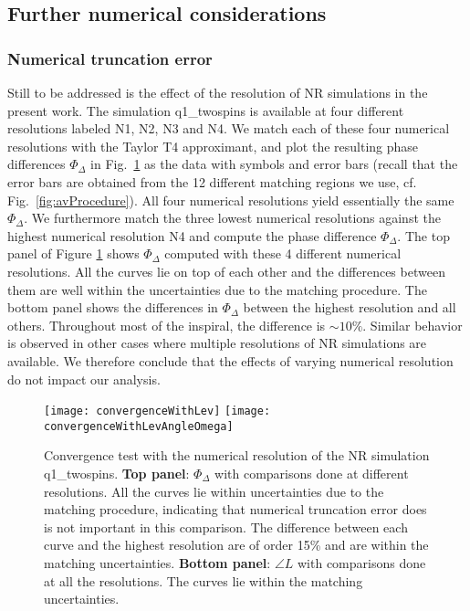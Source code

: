 \documentclass[aps,prd,amsmath,floatfix,twocolumn,superscriptaddress,nofootinbib,showpacs]{revtex4-1}
\begin{document}
\subsection{Further numerical considerations}
\label{sec:tech_cons}




\subsubsection{Numerical truncation error}

Still to be addressed is the effect of the resolution of NR
simulations in the present work.  The simulation q1\_twospins is
available at four different resolutions labeled N1, N2, N3 and N4.  We
match each of these four numerical resolutions with the Taylor T4
approximant, and plot the resulting phase differences $\Phi_\Delta$ in
Fig.~\ref{fig:convergenceWithLev} as the data with symbols and
error bars (recall that the error bars are obtained from the 12
different matching regions we use, cf. Fig.~\ref{fig:avProcedure}).
All four numerical resolutions yield essentially the same
$\Phi_\Delta$.  We furthermore match the three lowest numerical
resolutions against the highest numerical resolution N4 and compute
the phase difference $\Phi_\Delta$.  The top panel of Figure
\ref{fig:convergenceWithLev} shows $\Phi_{\Delta}$ computed with
these 4 different numerical resolutions. All the curves lie on top of
each other and the differences between them are well within the
uncertainties due to the matching procedure. The bottom panel shows
the differences in $\Phi_{\Delta}$ between the highest resolution and
all others. Throughout most of the inspiral, the difference is $\sim
10 \%$.  Similar behavior is observed in other cases where multiple
resolutions of NR simulations are available. We therefore conclude
that the effects of varying numerical resolution do not impact our
analysis.

\begin{figure}
  \texttt{[image: convergenceWithLev]}
  \texttt{[image: convergenceWithLevAngleOmega]}
  \caption{Convergence test with the numerical resolution of the NR
    simulation q1\_twospins. {\bf Top panel}: $\Phi_\Delta$
      with comparisons done at different resolutions. All the curves
      lie within uncertainties due to the matching procedure,
      indicating that numerical truncation error does is not important
      in this comparison. The difference between each curve and the
      highest resolution are of order 15\% and are within the matching
      uncertainties. {\bf Bottom panel}: $\angle L$ with comparisons
      done at all the resolutions. The curves lie within the matching
      uncertainties.} 
  \label{fig:convergenceWithLev}
\end{figure}
\end{document}
